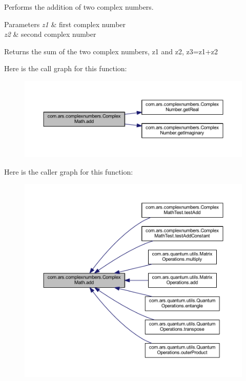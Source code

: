 Performs the addition of two complex numbers. 
\begin{DoxyParams}{Parameters}
{\em z1} & first complex number \\
\hline
{\em z2} & second complex number \\
\hline
\end{DoxyParams}
\begin{DoxyReturn}{Returns}
the sum of the two complex numbers, z1 and z2, z3=z1+z2 
\end{DoxyReturn}
Here is the call graph for this function\+:\nopagebreak
\begin{figure}[H]
\begin{center}
\leavevmode
\includegraphics[width=350pt]{classcom_1_1ars_1_1complexnumbers_1_1_complex_math_a5d0a70f5fa36204c59c62f3d63391c25_cgraph}
\end{center}
\end{figure}
Here is the caller graph for this function\+:\nopagebreak
\begin{figure}[H]
\begin{center}
\leavevmode
\includegraphics[width=350pt]{classcom_1_1ars_1_1complexnumbers_1_1_complex_math_a5d0a70f5fa36204c59c62f3d63391c25_icgraph}
\end{center}
\end{figure}
\hypertarget{classcom_1_1ars_1_1complexnumbers_1_1_complex_math_ac40f506def2684820fa0c85c6672f5a3}{}\label{classcom_1_1ars_1_1complexnumbers_1_1_complex_math_ac40f506def2684820fa0c85c6672f5a3} 
